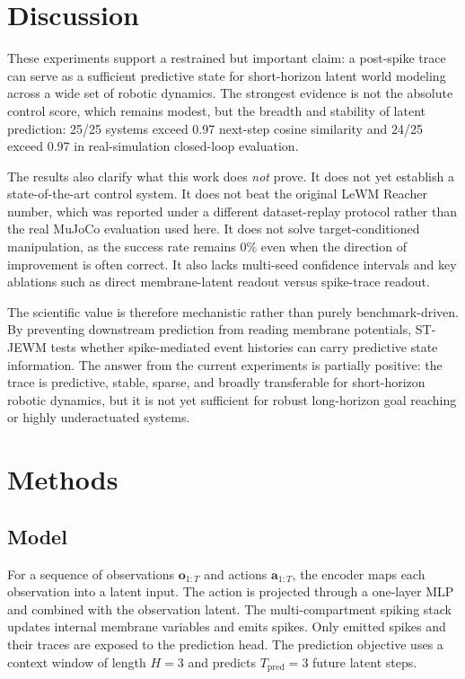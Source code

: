 \documentclass[10pt]{article}
\newcommand{\method}{ST-JEWM}
\newcommand{\action}{\mathbf{a}}
\newcommand{\obs}{\mathbf{o}}
\begin{document}
\section{Discussion}

These experiments support a restrained but important claim: a post-spike trace can serve as a sufficient predictive state for short-horizon latent world modeling across a wide set of robotic dynamics. The strongest evidence is not the absolute control score, which remains modest, but the breadth and stability of latent prediction: 25/25 systems exceed 0.97 next-step cosine similarity and 24/25 exceed 0.97 in real-simulation closed-loop evaluation.

The results also clarify what this work does \emph{not} prove. It does not yet establish a state-of-the-art control system. It does not beat the original LeWM Reacher number, which was reported under a different dataset-replay protocol rather than the real MuJoCo evaluation used here. It does not solve target-conditioned manipulation, as the success rate remains 0\% even when the direction of improvement is often correct. It also lacks multi-seed confidence intervals and key ablations such as direct membrane-latent readout versus spike-trace readout.

The scientific value is therefore mechanistic rather than purely benchmark-driven. By preventing downstream prediction from reading membrane potentials, \method{} tests whether spike-mediated event histories can carry predictive state information. The answer from the current experiments is partially positive: the trace is predictive, stable, sparse, and broadly transferable for short-horizon robotic dynamics, but it is not yet sufficient for robust long-horizon goal reaching or highly underactuated systems.

\section{Methods}

\subsection{Model}

For a sequence of observations $\obs_{1:T}$ and actions $\action_{1:T}$, the encoder maps each observation into a latent input. The action is projected through a one-layer MLP and combined with the observation latent. The multi-compartment spiking stack updates internal membrane variables and emits spikes. Only emitted spikes and their traces are exposed to the prediction head. The prediction objective uses a context window of length $H=3$ and predicts $T_{\mathrm{pred}}=3$ future latent steps.
\end{document}
